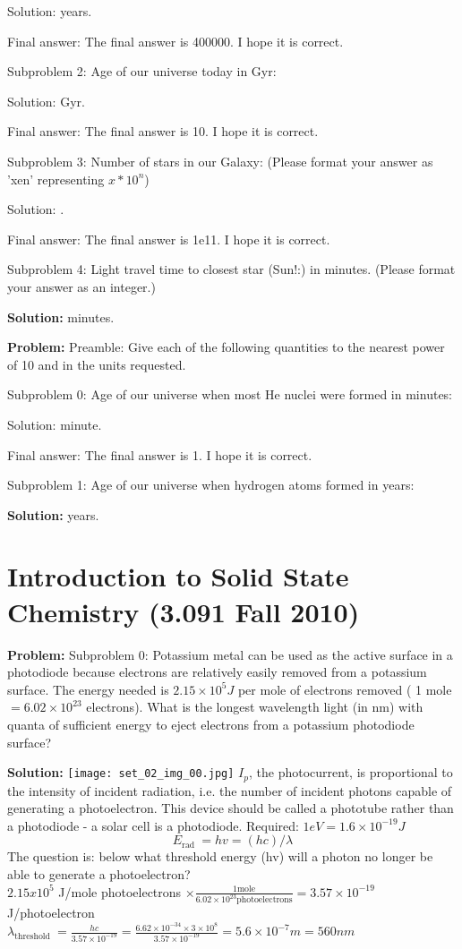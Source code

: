 \documentclass[10pt]{article}
\begin{document}
Solution:  years.

Final answer: The final answer is 400000. I hope it is correct.

Subproblem 2: Age of our universe today in Gyr:


Solution:  Gyr.

Final answer: The final answer is 10. I hope it is correct.

Subproblem 3: Number of stars in our Galaxy: (Please format your answer as 'xen' representing $x * 10^n$)


Solution: .

Final answer: The final answer is 1e11. I hope it is correct.

Subproblem 4: Light travel time to closest star (Sun!:) in minutes. (Please format your answer as an integer.)


\textbf{Solution:}
 minutes.


\textbf{Problem:}
Preamble: Give each of the following quantities to the nearest power of 10 and in the units requested. 

Subproblem 0: Age of our universe when most He nuclei were formed in minutes: 


Solution:  minute.

Final answer: The final answer is 1. I hope it is correct.

Subproblem 1: Age of our universe when hydrogen atoms formed in years:


\textbf{Solution:}
 years.


\section{Introduction to Solid State Chemistry (3.091 Fall 2010)}

\textbf{Problem:}
Subproblem 0: Potassium metal can be used as the active surface in a photodiode because electrons are relatively easily removed from a potassium surface. The energy needed is $2.15 \times 10^{5} J$ per mole of electrons removed ( 1 mole $=6.02 \times 10^{23}$ electrons). What is the longest wavelength light (in nm) with quanta of sufficient energy to eject electrons from a potassium photodiode surface?


\textbf{Solution:}
\texttt{[image: set\_02\_img\_00.jpg]}
\nonessentialimage
$I_{p}$, the photocurrent, is proportional to the intensity of incident radiation, i.e. the number of incident photons capable of generating a photoelectron.
This device should be called a phototube rather than a photodiode - a solar cell is a photodiode. 
Required: $1 eV=1.6 \times 10^{-19} J$
\[
E_{\text {rad }}=h v=(hc) / \lambda
\]
The question is: below what threshold energy (hv) will a photon no longer be able to generate a photoelectron?\\
$2.15 x 10^{5}$ J/mole photoelectrons $\times \frac{1 \text{mole}}{6.02 \times 10^{23} \text{photoelectrons}} = 3.57 \times 10^{-19}$ J/photoelectron\\
$\lambda_{\text {threshold }}=\frac{hc}{3.57 \times 10^{-19}}=\frac{6.62 \times 10^{-34} \times 3 \times 10^{8}}{3.57 \times 10^{-19}}=5.6 \times 10^{-7} m= \boxed{560} nm$
\end{document}
